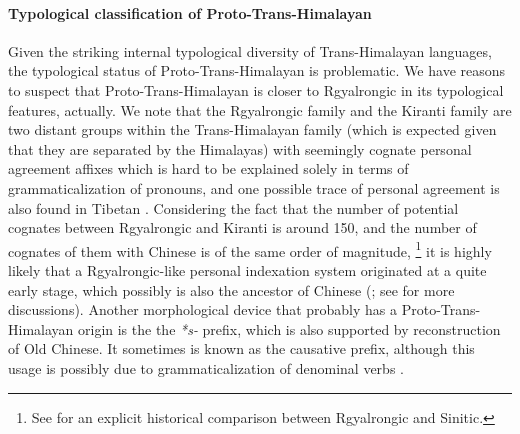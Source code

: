 \documentclass[UTF8, a4paper, oneside, scheme=plain, 12pt]{ctexrep}
\newcommand{\form}[1]{\emph{#1}}
\begin{document}
\paragraph*{Typological classification of Proto-Trans-Himalayan}
Given the striking internal typological diversity of Trans-Himalayan languages,
the typological status of Proto-Trans-Himalayan is problematic.
We have reasons to suspect that Proto-Trans-Himalayan is closer to Rgyalrongic in its typological features, actually.
We note that the Rgyalrongic family and the Kiranti family are two distant groups within the Trans-Himalayan family
(which is expected given that they are separated by the Himalayas)
with seemingly cognate personal agreement affixes
which is hard to be explained solely in terms of grammaticalization of pronouns,
and one possible trace of personal agreement is also found in Tibetan
\citep{jacques2012agreement,jacques2010possible,jacques2016tangut}.
Considering the fact that the number of potential cognates between Rgyalrongic and Kiranti is around 150,
and the number of cognates of them with Chinese is of the same order of magnitude,%
\footnote{
    See \citet{shuya2019study} for an explicit historical comparison between Rgyalrongic and Sinitic.
}
it is highly likely that a Rgyalrongic-like personal indexation system originated at a quite early stage,
which possibly is also the ancestor of Chinese
(\citealt{jacques2012agreement}; see  for more discussions).
Another morphological device that probably has a Proto-Trans-Himalayan origin is the the \form{*s-} prefix,
which is also supported by reconstruction of Old Chinese.
It sometimes is known as the causative prefix,
although this usage is possibly due to grammaticalization of denominal verbs
\citep{jacques2015origin}.
\end{document}
